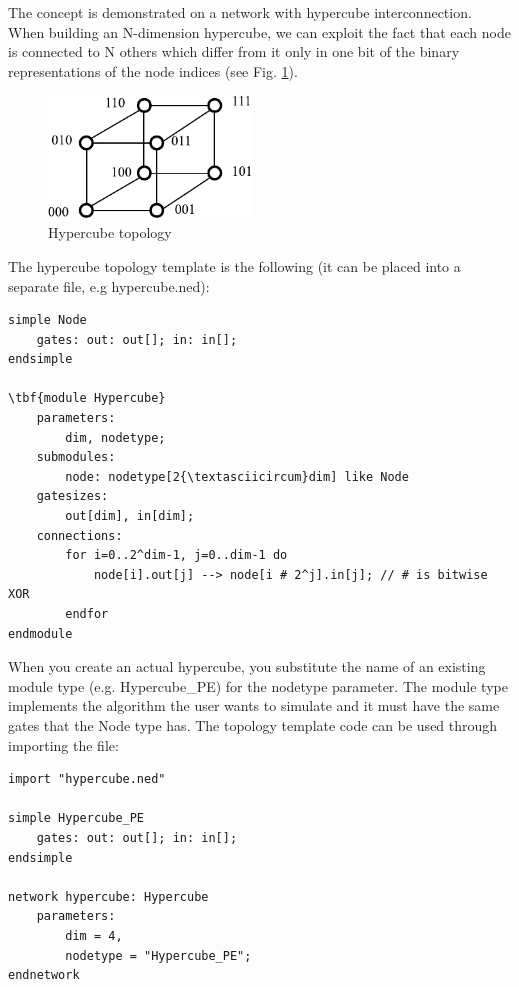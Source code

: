 

The concept is demonstrated on a network with hypercube interconnection. 
When building an N-dimension hypercube, we can exploit the fact 
that each node is connected to N others which differ from it 
only in one bit of the binary representations of the node indices 
(see Fig. \ref{fig:ch-ned-lang:hypercube-topology}). 

\begin{figure}[htbp]
  \begin{center}
    \includegraphics[width=2.111in, height=1.285in]{figures/usmanFig8}
    \caption{Hypercube topology}
    \label{fig:ch-ned-lang:hypercube-topology}
  \end{center}
\end{figure}


The hypercube topology template is the
following (it can be placed into a separate file, e.g hypercube.ned):


\begin{Verbatim}[commandchars=\\\{\}]
simple Node 
    gates: out: out[]; in: in[];
endsimple

\tbf{module Hypercube}
    parameters:
        dim, nodetype; 
    submodules:
        node: nodetype[2{\textasciicircum}dim] like Node
    gatesizes:
        out[dim], in[dim];
    connections:
        for i=0..2^dim-1, j=0..dim-1 do
            node[i].out[j] --> node[i # 2^j].in[j]; // # is bitwise XOR 
        endfor
endmodule
\end{Verbatim}



When you create an actual hypercube, you substitute the name 
of an existing module type (e.g. Hypercube\_PE) for the nodetype 
parameter. The module type implements the algorithm the user 
wants to simulate and it must have the same gates that the Node 
type has. The topology template code can be used through importing 
the file: 


\begin{Verbatim}[commandchars=\\\{\}]
import "hypercube.ned"
  
simple Hypercube_PE
    gates: out: out[]; in: in[];
endsimple

network hypercube: Hypercube 
    parameters:
        dim = 4,
        nodetype = "Hypercube_PE";
endnetwork
\end{Verbatim}




